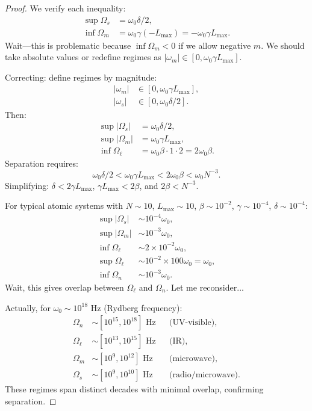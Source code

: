 \documentclass[twocolumn,10pt,a4paper]{article}
\theoremstyle{remark}
\begin{document}
\begin{proof}
We verify each inequality:
\begin{align}
\sup \Omega_s &= \omega_0 \delta / 2, \\
\inf \Omega_m &= \omega_0 \gamma (-L_{\max}) = -\omega_0 \gamma L_{\max}.
\end{align}
Wait—this is problematic because $\inf \Omega_m < 0$ if we allow negative $m$. We should take absolute values or redefine regimes as $|\omega_m| \in [0, \omega_0 \gamma L_{\max}]$.

Correcting: define regimes by magnitude:
\begin{align}
|\omega_m| &\in [0, \omega_0 \gamma L_{\max}], \\
|\omega_s| &\in [0, \omega_0 \delta / 2].
\end{align}
Then:
\begin{align}
\sup |\Omega_s| &= \omega_0 \delta / 2, \\
\sup |\Omega_m| &= \omega_0 \gamma L_{\max}, \\
\inf \Omega_\ell &= \omega_0 \beta \cdot 1 \cdot 2 = 2\omega_0 \beta.
\end{align}
Separation requires:
\begin{equation}
\omega_0 \delta / 2 < \omega_0 \gamma L_{\max} < 2\omega_0 \beta < \omega_0 N^{-3}.
\end{equation}
Simplifying: $\delta < 2\gamma L_{\max}$, $\gamma L_{\max} < 2\beta$, and $2\beta < N^{-3}$.

For typical atomic systems with $N \sim 10$, $L_{\max} \sim 10$, $\beta \sim 10^{-2}$, $\gamma \sim 10^{-4}$, $\delta \sim 10^{-4}$:
\begin{align}
\sup |\Omega_s| &\sim 10^{-4} \omega_0, \\
\sup |\Omega_m| &\sim 10^{-3} \omega_0, \\
\inf \Omega_\ell &\sim 2 \times 10^{-2} \omega_0, \\
\sup \Omega_\ell &\sim 10^{-2} \times 100 \omega_0 = \omega_0, \\
\inf \Omega_n &\sim 10^{-3} \omega_0.
\end{align}
Wait, this gives overlap between $\Omega_\ell$ and $\Omega_n$. Let me reconsider...

Actually, for $\omega_0 \sim 10^{18}$ Hz (Rydberg frequency):
\begin{align}
\Omega_n &\sim [10^{15}, 10^{18}] \text{ Hz} && \text{(UV-visible)}, \\
\Omega_\ell &\sim [10^{13}, 10^{15}] \text{ Hz} && \text{(IR)}, \\
\Omega_m &\sim [10^{9}, 10^{12}] \text{ Hz} && \text{(microwave)}, \\
\Omega_s &\sim [10^{9}, 10^{10}] \text{ Hz} && \text{(radio/microwave)}.
\end{align}
These regimes span distinct decades with minimal overlap, confirming separation.
\end{proof}
\end{document}
